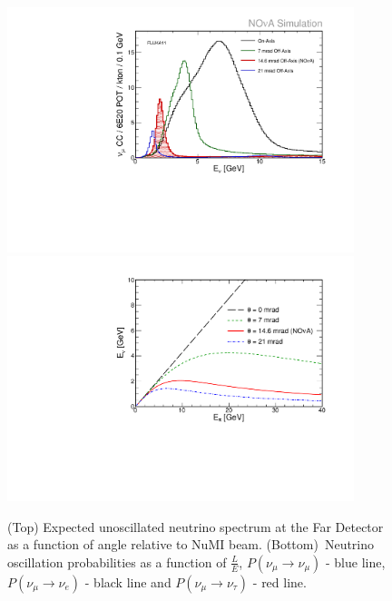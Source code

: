\begin{figure}
\includegraphics[width=0.9\textwidth]{figures/FD_NOvA_OffAxis_Spectra.pdf}\\%
\includegraphics[width=0.9\textwidth]{figures/EnuVSEpi_NOvA.pdf}
\centering
\caption{(Top) Expected unoscillated neutrino spectrum at the Far Detector as a function of 
angle relative to NuMI beam. (Bottom)~Neutrino oscillation probabilities as a function of $\frac{L}{E}$, $
P(\nu_\mu \rightarrow \nu_\mu)$ - blue line, $P(\nu_\mu \rightarrow \nu_e)$ - black line and 
$P(\nu_\mu \rightarrow \nu_\tau)$ - red line.} \label{fig:Spec}
\end{figure}

